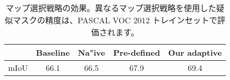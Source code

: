 \begin{table}[]
\centering

{\small
\begin{tabular}{@{}ccccc@{}}
\toprule
                            & Baseline  & Na"ive   & Pre-defined   & Our adaptive \\ \midrule
\multicolumn{1}{l}{mIoU}    &66.1       & 66.5      & 67.9          & 69.4   \\ \bottomrule
\end{tabular}
}
\vspace{2mm}
\caption{マップ選択戦略の効果。異なるマップ選択戦略を使用した疑似マスクの精度は、PASCAL VOC 2012 トレインセットで評価されます。} \vspace{-2mm}
\label{tab:strategy}
\end{table}
